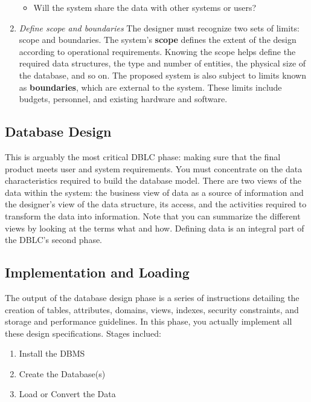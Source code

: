 \documentclass[a4paper, 12pt, titlepage]{report}
\begin{document}
\begin{enumerate}
\begin{itemize}
\item Will the system share the data with other systems or users?
\end{itemize}
\item \emph{Define scope and boundaries}
The designer must recognize two sets of limits: scope and boundaries. The system’s \textbf{scope} defines the extent of the design according to operational requirements. Knowing the scope helps define the required data structures, the type and number of entities, the physical size of the database, and so on. The proposed system is also subject to limits known as \textbf{boundaries}, which are external to the system. These limits include budgets, personnel, and existing hardware and software.
\end{enumerate}
\subsection{Database Design}
This is arguably the most critical DBLC phase: making sure that the final product meets user and system requirements. You must concentrate on the data characteristics required to build the database model. There are two views of the data within the system: the business view of data as a source of information and the designer’s view of the data structure, its access, and the activities required to transform the data into information. Note that you can summarize the different views by looking at the terms what and how. Defining data is an integral part of the DBLC’s second phase.
\subsection{Implementation and Loading}
The output of the database design phase is a series of instructions detailing the creation of tables, attributes, domains, views, indexes, security constraints, and storage and performance guidelines. In this phase, you actually implement all these design specifications. Stages inclued:
\begin{enumerate}
\item Install the DBMS
\item Create the Database(s)
\item Load or Convert the Data
\end{enumerate}
\end{document}
